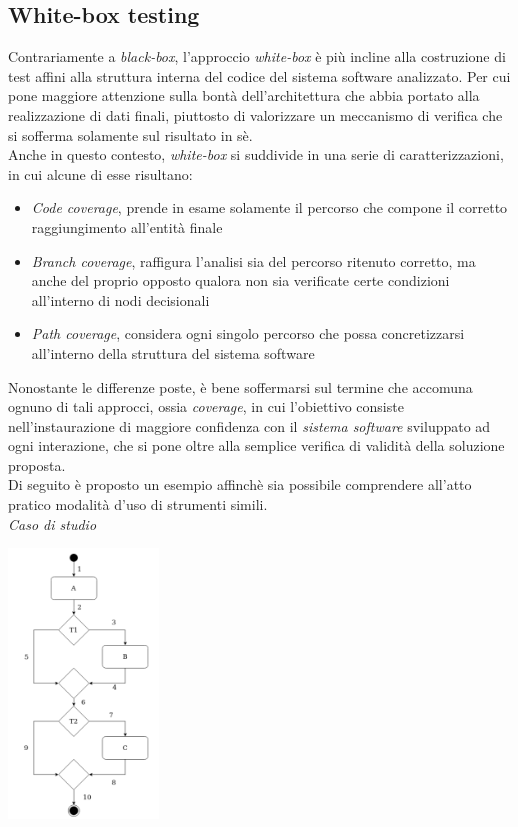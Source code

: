 \documentclass{article}
\begin{document}
\subsection*{White-box testing}
\large
Contrariamente a \textit{black-box}, l'approccio \textit{white-box} è più incline alla costruzione di test affini alla struttura interna del codice del sistema software analizzato. Per cui pone maggiore attenzione sulla bontà dell'architettura che abbia portato alla realizzazione di dati finali, piuttosto di valorizzare un meccanismo di verifica che si sofferma solamente sul risultato in sè.\vspace*{14pt}\\
Anche in questo contesto, \textit{white-box} si suddivide in una serie di caratterizzazioni, in cui alcune di esse risultano:
\begin{itemize}[label={-}]
    \itemsep0em
    \item \textit{Code coverage}, prende in esame solamente il percorso che compone il corretto raggiungimento all'entità finale
    \item \textit{Branch coverage}, raffigura l'analisi sia del percorso ritenuto corretto, ma anche del proprio opposto qualora non sia verificate certe condizioni all'interno di nodi decisionali
    \item \textit{Path coverage}, considera ogni singolo percorso che possa concretizzarsi all'interno della struttura del sistema software 
\end{itemize}
Nonostante le differenze poste, è bene soffermarsi sul termine che accomuna ognuno di tali approcci, ossia \textit{coverage}, in cui l'obiettivo consiste nell'instaurazione di maggiore confidenza con il \textit{sistema software} sviluppato ad ogni interazione, che si pone oltre alla semplice verifica di validità della soluzione proposta.\vspace*{14pt}\\
Di seguito è proposto un esempio affinchè sia possibile comprendere all'atto pratico modalità d'uso di strumenti simili.\vspace*{14pt}\\
\textit{Caso di studio}\\
\begin{center}
    \includegraphics[width=0.3\textwidth]{foto 1.png}
\end{center}
\end{document}
